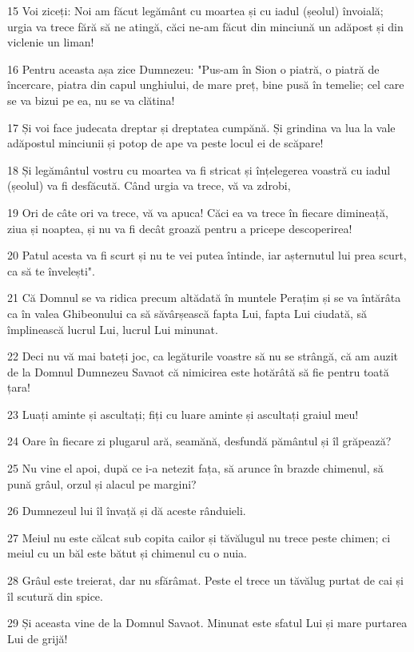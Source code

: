 \par 15 Voi ziceți: Noi am făcut legământ cu moartea și cu iadul (șeolul) învoială; urgia va trece fără să ne atingă, căci ne-am făcut din minciună un adăpost și din viclenie un liman!
\par 16 Pentru aceasta așa zice Dumnezeu: "Pus-am în Sion o piatră, o piatră de încercare, piatra din capul unghiului, de mare preț, bine pusă în temelie; cel care se va bizui pe ea, nu se va clătina!
\par 17 Și voi face judecata dreptar și dreptatea cumpănă. Și grindina va lua la vale adăpostul minciunii și potop de ape va peste locul ei de scăpare!
\par 18 Și legământul vostru cu moartea va fi stricat și înțelegerea voastră cu iadul (șeolul) va fi desfăcută. Când urgia va trece, vă va zdrobi,
\par 19 Ori de câte ori va trece, vă va apuca! Căci ea va trece în fiecare dimineață, ziua și noaptea, și nu va fi decât groază pentru a pricepe descoperirea!
\par 20 Patul acesta va fi scurt și nu te vei putea întinde, iar așternutul lui prea scurt, ca să te învelești".
\par 21 Că Domnul se va ridica precum altădată în muntele Perațim și se va întărâta ca în valea Ghibeonului ca să săvârșească fapta Lui, fapta Lui ciudată, să împlinească lucrul Lui, lucrul Lui minunat.
\par 22 Deci nu vă mai bateți joc, ca legăturile voastre să nu se strângă, că am auzit de la Domnul Dumnezeu Savaot că nimicirea este hotărâtă să fie pentru toată țara!
\par 23 Luați aminte și ascultați; fiți cu luare aminte și ascultați graiul meu!
\par 24 Oare în fiecare zi plugarul ară, seamănă, desfundă pământul și îl grăpează?
\par 25 Nu vine el apoi, după ce i-a netezit fața, să arunce în brazde chimenul, să pună grâul, orzul și alacul pe margini?
\par 26 Dumnezeul lui îl învață și dă aceste rânduieli.
\par 27 Meiul nu este călcat sub copita cailor și tăvălugul nu trece peste chimen; ci meiul cu un băl este bătut și chimenul cu o nuia.
\par 28 Grâul este treierat, dar nu sfărâmat. Peste el trece un tăvălug purtat de cai și îl scutură din spice.
\par 29 Și aceasta vine de la Domnul Savaot. Minunat este sfatul Lui și mare purtarea Lui de grijă!

